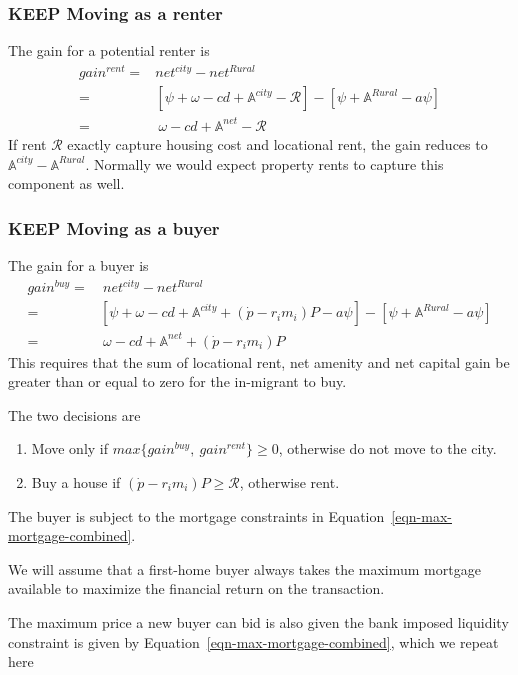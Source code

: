 {{\subsubsection{KEEP Moving as a renter}
The gain for a potential renter is 
\begin{align}
gain^{rent}=&net^{city}-net^{Rural}\nonumber\\
=&\left[\psi+\omega-cd+\mathbb{A}^{city}-\mathcal{R}\right]-\left[\psi+\mathbb{A}^{Rural}-a\psi\right] \nonumber\\
=&\ \omega-cd+\mathbb{A}^{net}-\mathcal{R}
\label{eq-move-to-rent}
\end{align}
If rent $\mathcal{R}$ exactly capture housing cost and locational rent, the gain reduces to $\mathbb{A}^{city}-\mathbb{A}^{Rural}$. Normally we would expect property rents to capture this component  as well. 

\subsubsection{KEEP Moving as a buyer}
The gain for a buyer is 
\begin{align}
gain^{buy}=&\ net^{city}-net^{Rural}\nonumber\\
=&\left[\psi+\omega-cd+\mathbb{A}^{city}+(\dot p-r_im_i)P-a\psi\right]-\left[\psi+\mathbb{A}^{Rural}-a\psi\right] \nonumber\\
=&\ \omega-cd+\mathbb{A}^{net}+(\dot p-r_im_i)P  \label{eq-move-to-buy}
\end{align}
This requires that the sum of  locational rent, net amenity and net capital gain be greater than or equal to zero for the in-migrant to buy.

The two decisions  are 
\begin{enumerate}
    \item Move only if $max\{gain^{buy},\ gain^{rent}\} \ge 0$, otherwise do not move to the city.
    
    \item Buy a house if $(\dot p-r_im_i)P\ge  \mathcal{R}$, otherwise rent.
\end{enumerate}

The buyer is subject to the mortgage constraints in Equation~\ref{eqn-max-mortgage-combined}.

We will assume that a first-home buyer always takes the maximum mortgage available to maximize the financial return on the transaction. 

The maximum price a new buyer can bid is also given the bank imposed liquidity constraint is given by Equation~\ref{eqn-max-mortgage-combined}, which we repeat here


}}
